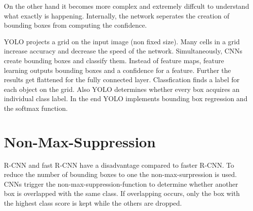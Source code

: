 \documentclass[a4paper,13pt,twoside]{book}
\begin{document}
On the other hand it becomes more complex and extremely diffcult to understand what exactly is happening. Internally, the network seperates the creation of bounding boxes from computing the confidence.

YOLO projects a grid on the input image (non fixed size). Many cells in a grid increase accuracy and decrease the speed of the network. Simultaneously, CNNs create bounding boxes and classify them. Instead of feature maps, feature learning outputs bounding boxes and a confidence for a feature. Further the results get flattened for the fully connected layer. Classfication finds a label for each object on the grid. Also YOLO determines whether every box acquires an individual class label. In the end YOLO implements bounding box regression and the softmax function.

\section{Non-Max-Suppression}

R-CNN and fast R-CNN have a disadvantage compared to faster R-CNN. To reduce the number of bounding boxes to one the non-max-surpression is used. CNNs trigger the non-max-suppression-function to determine whether another box is overlapped with the same class. If overlapping occurs, only the box with the highest class score is kept while the others are dropped.
\end{document}

